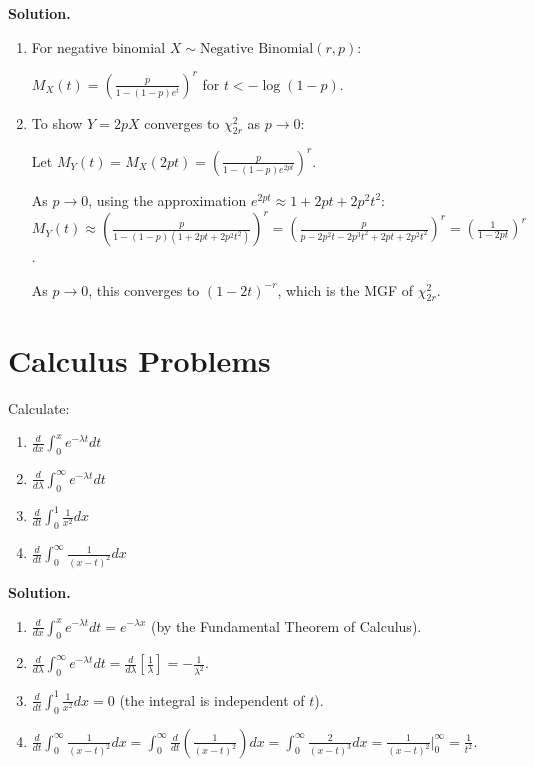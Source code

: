 \noindent\textbf{Solution.}
\begin{enumerate}[label=(\alph*)]
    \item For negative binomial $X \sim \text{Negative Binomial}(r,p)$:
    
    $M_X(t) = \left(\frac{p}{1-(1-p)e^t}\right)^r$ for $t < -\log(1-p)$.
    
    \item To show $Y = 2pX$ converges to $\chi^2_{2r}$ as $p \to 0$:
    
    Let $M_Y(t) = M_X(2pt) = \left(\frac{p}{1-(1-p)e^{2pt}}\right)^r$.
    
    As $p \to 0$, using the approximation $e^{2pt} \approx 1 + 2pt + 2p^2t^2$:
    $M_Y(t) \approx \left(\frac{p}{1-(1-p)(1+2pt+2p^2t^2)}\right)^r = \left(\frac{p}{p-2p^2t-2p^3t^2+2pt+2p^2t^2}\right)^r = \left(\frac{1}{1-2pt}\right)^r$.
    
    As $p \to 0$, this converges to $(1-2t)^{-r}$, which is the MGF of $\chi^2_{2r}$.
\end{enumerate}

\section{Calculus Problems}

\begin{problembox}
Calculate:
\begin{enumerate}[label=(\alph*)]
    \item $\frac{d}{dx}\int_0^x e^{-\lambda t}dt$
    \item $\frac{d}{d\lambda}\int_0^\infty e^{-\lambda t}dt$
    \item $\frac{d}{dt}\int_0^1 \frac{1}{x^2}dx$
    \item $\frac{d}{dt}\int_0^\infty \frac{1}{(x-t)^2}dx$
\end{enumerate}
\end{problembox}

\noindent\textbf{Solution.}
\begin{enumerate}[label=(\alph*)]
    \item $\frac{d}{dx}\int_0^x e^{-\lambda t}dt = e^{-\lambda x}$ (by the Fundamental Theorem of Calculus).
    
    \item $\frac{d}{d\lambda}\int_0^\infty e^{-\lambda t}dt = \frac{d}{d\lambda}\left[\frac{1}{\lambda}\right] = -\frac{1}{\lambda^2}$.
    
    \item $\frac{d}{dt}\int_0^1 \frac{1}{x^2}dx = 0$ (the integral is independent of $t$).
    
    \item $\frac{d}{dt}\int_0^\infty \frac{1}{(x-t)^2}dx = \int_0^\infty \frac{d}{dt}\left(\frac{1}{(x-t)^2}\right)dx = \int_0^\infty \frac{2}{(x-t)^3}dx = \frac{1}{(x-t)^2}|_0^\infty = \frac{1}{t^2}$.
\end{enumerate}

